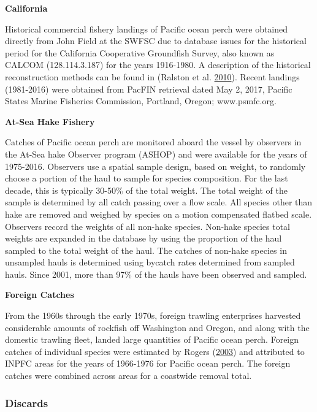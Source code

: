 \documentclass[12pt,]{article}
\begin{document}
\textbf{California}

Historical commercial fishery landings of Pacific ocean perch were
obtained directly from John Field at the SWFSC due to database issues
for the historical period for the California Cooperative Groundfish
Survey, also known as CALCOM (128.114.3.187) for the years 1916-1980. A
description of the historical reconstruction methods can be found in
(Ralston et al.
\protect\hyperlink{ref-ralston_documentation_2010}{2010}). Recent
landings (1981-2016) were obtained from PacFIN retrieval dated May 2,
2017, Pacific States Marine Fisheries Commission, Portland, Oregon;
www.psmfc.org.

\textbf{At-Sea Hake Fishery}

Catches of Pacific ocean perch are monitored aboard the vessel by
observers in the At-Sea hake Observer program (ASHOP) and were available
for the years of 1975-2016. Observers use a spatial sample design, based
on weight, to randomly choose a portion of the haul to sample for
species composition. For the last decade, this is typically 30-50\% of
the total weight. The total weight of the sample is determined by all
catch passing over a flow scale. All species other than hake are removed
and weighed by species on a motion compensated flatbed scale. Observers
record the weights of all non-hake species. Non-hake species total
weights are expanded in the database by using the proportion of the haul
sampled to the total weight of the haul. The catches of non-hake species
in unsampled hauls is determined using bycatch rates determined from
sampled hauls. Since 2001, more than 97\% of the hauls have been
observed and sampled.

\textbf{Foreign Catches}

From the 1960s through the early 1970s, foreign trawling enterprises
harvested considerable amounts of rockfish off Washington and Oregon,
and along with the domestic trawling fleet, landed large quantities of
Pacific ocean perch. Foreign catches of individual species were
estimated by Rogers (\protect\hyperlink{ref-rogers_species_2003}{2003})
and attributed to INPFC areas for the years of 1966-1976 for Pacific
ocean perch. The foreign catches were combined across areas for a
coastwide removal total.

\subsubsection{Discards}\label{discards}
\end{document}
